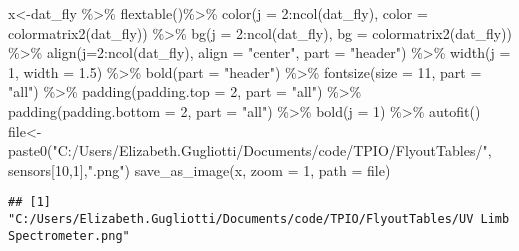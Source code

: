 \documentclass[
]{article}
\newenvironment{Shaded}{\begin{snugshade}}{\end{snugshade}}
\newcommand{\AttributeTok}[1]{\textcolor[rgb]{0.77,0.63,0.00}{#1}}
\newcommand{\DecValTok}[1]{\textcolor[rgb]{0.00,0.00,0.81}{#1}}
\newcommand{\FloatTok}[1]{\textcolor[rgb]{0.00,0.00,0.81}{#1}}
\newcommand{\FunctionTok}[1]{\textcolor[rgb]{0.00,0.00,0.00}{#1}}
\newcommand{\NormalTok}[1]{#1}
\newcommand{\OtherTok}[1]{\textcolor[rgb]{0.56,0.35,0.01}{#1}}
\newcommand{\SpecialCharTok}[1]{\textcolor[rgb]{0.00,0.00,0.00}{#1}}
\newcommand{\StringTok}[1]{\textcolor[rgb]{0.31,0.60,0.02}{#1}}
\begin{document}
\begin{Shaded}
\begin{Highlighting}[]
\NormalTok{x}\OtherTok{\textless{}{-}}\NormalTok{dat\_fly }\SpecialCharTok{\%\textgreater{}\%}
    \FunctionTok{flextable}\NormalTok{()}\SpecialCharTok{\%\textgreater{}\%}
    \FunctionTok{color}\NormalTok{(}\AttributeTok{j =} \DecValTok{2}\SpecialCharTok{:}\FunctionTok{ncol}\NormalTok{(dat\_fly), }\AttributeTok{color =} \FunctionTok{colormatrix2}\NormalTok{(dat\_fly)) }\SpecialCharTok{\%\textgreater{}\%}
    \FunctionTok{bg}\NormalTok{(}\AttributeTok{j =} \DecValTok{2}\SpecialCharTok{:}\FunctionTok{ncol}\NormalTok{(dat\_fly), }\AttributeTok{bg =} \FunctionTok{colormatrix2}\NormalTok{(dat\_fly)) }\SpecialCharTok{\%\textgreater{}\%}
    \FunctionTok{align}\NormalTok{(}\AttributeTok{j=}\DecValTok{2}\SpecialCharTok{:}\FunctionTok{ncol}\NormalTok{(dat\_fly), }\AttributeTok{align =} \StringTok{"center"}\NormalTok{, }\AttributeTok{part =} \StringTok{"header"}\NormalTok{) }\SpecialCharTok{\%\textgreater{}\%}
    \FunctionTok{width}\NormalTok{(}\AttributeTok{j =} \DecValTok{1}\NormalTok{, }\AttributeTok{width =} \FloatTok{1.5}\NormalTok{) }\SpecialCharTok{\%\textgreater{}\%}
    \FunctionTok{bold}\NormalTok{(}\AttributeTok{part =} \StringTok{"header"}\NormalTok{) }\SpecialCharTok{\%\textgreater{}\%}
    \FunctionTok{fontsize}\NormalTok{(}\AttributeTok{size =} \DecValTok{11}\NormalTok{, }\AttributeTok{part =} \StringTok{"all"}\NormalTok{) }\SpecialCharTok{\%\textgreater{}\%}
    \FunctionTok{padding}\NormalTok{(}\AttributeTok{padding.top =} \DecValTok{2}\NormalTok{, }\AttributeTok{part =} \StringTok{"all"}\NormalTok{) }\SpecialCharTok{\%\textgreater{}\%}
    \FunctionTok{padding}\NormalTok{(}\AttributeTok{padding.bottom =} \DecValTok{2}\NormalTok{, }\AttributeTok{part =} \StringTok{"all"}\NormalTok{) }\SpecialCharTok{\%\textgreater{}\%}
    \FunctionTok{bold}\NormalTok{(}\AttributeTok{j =} \DecValTok{1}\NormalTok{) }\SpecialCharTok{\%\textgreater{}\%} \FunctionTok{autofit}\NormalTok{()}
\NormalTok{file}\OtherTok{\textless{}{-}}\FunctionTok{paste0}\NormalTok{(}\StringTok{"C:/Users/Elizabeth.Gugliotti/Documents/code/TPIO/FlyoutTables/"}\NormalTok{, sensors[}\DecValTok{10}\NormalTok{,}\DecValTok{1}\NormalTok{],}\StringTok{".png"}\NormalTok{)}
\FunctionTok{save\_as\_image}\NormalTok{(x, }\AttributeTok{zoom =} \DecValTok{1}\NormalTok{, }\AttributeTok{path =}\NormalTok{ file)}
\end{Highlighting}
\end{Shaded}

\begin{verbatim}
## [1] "C:/Users/Elizabeth.Gugliotti/Documents/code/TPIO/FlyoutTables/UV Limb Spectrometer.png"
\end{verbatim}
\end{document}

